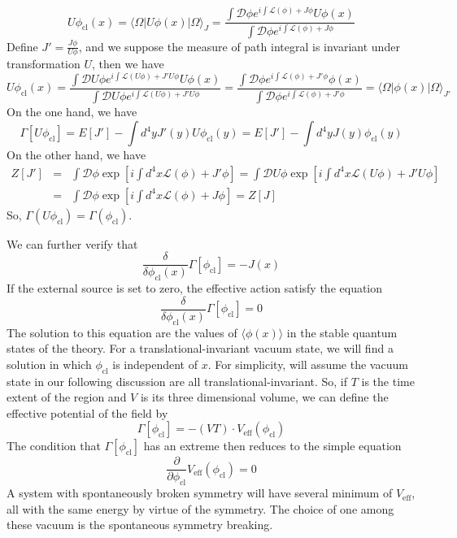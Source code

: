 \begin{newproof}
\[ U\phi_{\mathrm{cl}}(x) = \langle \Omega | U\phi(x) | \Omega\rangle_{J} = \frac{\int \mathcal{D}\phi e^{i \int \mathcal{L}(\phi)+J\phi}U\phi(x)}{\int \mathcal{D}\phi e^{i \int \mathcal{L}(\phi)+J\phi}}\]
Define $J' = \frac{J\phi}{U\phi}$,  and we suppose the measure of path integral is invariant under transformation $U$, then we have
\[ U\phi_{\mathrm{cl}}(x) = \frac{\int \mathcal{D}U\phi e^{i \int \mathcal{L}(U\phi)+J'U\phi}U\phi(x)}{\int \mathcal{D}U\phi e^{i \int \mathcal{L}(U\phi)+J'U\phi}} =  \frac{\int \mathcal{D}\phi e^{i \int \mathcal{L}(\phi)+J'\phi}\phi(x)}{\int \mathcal{D}\phi e^{i \int \mathcal{L}(\phi)+J'\phi}} = \langle \Omega | \phi(x) | \Omega\rangle_{J'}\]
On the one hand, we have
\[\Gamma[U\phi_{\mathrm{cl}}] = E[J'] - \int d^4y J'(y)U\phi_{\mathrm{cl}}(y) =  E[J'] - \int d^4y J(y)\phi_{\mathrm{cl}}(y)\]
On the other hand, we have
\begin{eqnarray}
Z[J'] &=& \int \mathcal{D}\phi \exp \left[ i \int d^4x \mathcal{L}(\phi)+J'\phi \right] =  \int \mathcal{D}U\phi \exp \left[ i \int d^4x \mathcal{L}(U\phi)+J'U\phi \right] \nonumber
\\
&=& \int \mathcal{D}\phi \exp \left[ i \int d^4x \mathcal{L}(\phi)+J\phi \right] = Z[J] \nonumber
\end{eqnarray}
So, $\Gamma(U\phi_{\mathrm{cl}}) = \Gamma(\phi_{\mathrm{cl}})$.
\end{newproof}

\noindent
We can further verify that
\[\frac{\delta}{\delta \phi_{\mathrm{cl}}(x)} \Gamma[\phi_{\mathrm{cl}}] = -J(x)\]
If the external source is set to zero, the effective action satisfy the equation
\[\frac{\delta}{\delta \phi_{\mathrm{cl}}(x)} \Gamma[\phi_{\mathrm{cl}}] = 0\]
The solution to this equation are the values of $\langle \phi(x) \rangle$ in the stable quantum states of the theory. For a translational-invariant vacuum state, we will find a solution in which $\phi_{\mathrm{cl}}$ is independent of $x$. For simplicity, will assume the vacuum state in our following discussion are all translational-invariant. 
So, if $T$ is the time extent of the region and $V$ is its three dimensional volume, we can define the effective potential of the field by
\[\Gamma[\phi_{\mathrm{cl}}] = -(VT) \cdot V_{\mathrm{eff}}(\phi_{\mathrm{cl}})\]
The condition that $\Gamma[\phi_{\mathrm{cl}}]$ has an extreme then reduces to the simple equation
\[\frac{\partial}{\partial \phi_{\mathrm{cl}}} V_{\mathrm{eff}}(\phi_{\mathrm{cl}}) = 0\] 
A system with spontaneously broken symmetry will have several minimum of $V_{\mathrm{eff}}$, all with the same energy by virtue of the symmetry. The choice of one among these vacuum is the spontaneous symmetry breaking.

